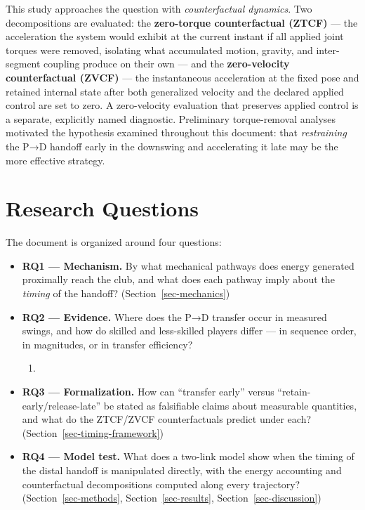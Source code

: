 \documentclass[
  letterpaper,
]{report}
\providecommand{\tightlist}{%
  \setlength{\itemsep}{0pt}\setlength{\parskip}{0pt}}
\begin{document}
This study approaches the question with \emph{counterfactual dynamics}.
Two decompositions are evaluated: the \textbf{zero-torque counterfactual
(ZTCF)} --- the acceleration the system would exhibit at the current
instant if all applied joint torques were removed, isolating what
accumulated motion, gravity, and inter-segment coupling produce on their
own --- and the \textbf{zero-velocity counterfactual (ZVCF)} --- the
instantaneous acceleration at the fixed pose and retained internal state
after both generalized velocity and the declared applied control are set
to zero. A zero-velocity evaluation that preserves applied control is a
separate, explicitly named diagnostic. Preliminary torque-removal
analyses motivated the hypothesis examined throughout this document:
that \emph{restraining} the P→D handoff early in the downswing and
accelerating it late may be the more effective strategy.

\section{Research Questions}\label{research-questions}

The document is organized around four questions:

\begin{itemize}
\tightlist
\item
  \textbf{RQ1 --- Mechanism.} By what mechanical pathways does energy
  generated proximally reach the club, and what does each pathway imply
  about the \emph{timing} of the handoff? (Section~\ref{sec-mechanics})
\item
  \textbf{RQ2 --- Evidence.} Where does the P→D transfer occur in
  measured swings, and how do skilled and less-skilled players differ
  --- in sequence order, in magnitudes, or in transfer efficiency?

  \begin{enumerate}
  \def\labelenumi{(\arabic{enumi})}
  \tightlist
  \item
  \end{enumerate}
\item
  \textbf{RQ3 --- Formalization.} How can ``transfer early'' versus
  ``retain-early/release-late'' be stated as falsifiable claims about
  measurable quantities, and what do the ZTCF/ZVCF counterfactuals
  predict under each? (Section~\ref{sec-timing-framework})
\item
  \textbf{RQ4 --- Model test.} What does a two-link model show when the
  timing of the distal handoff is manipulated directly, with the energy
  accounting and counterfactual decompositions computed along every
  trajectory? (Section~\ref{sec-methods}, Section~\ref{sec-results},
  Section~\ref{sec-discussion})
\end{itemize}
\end{document}
